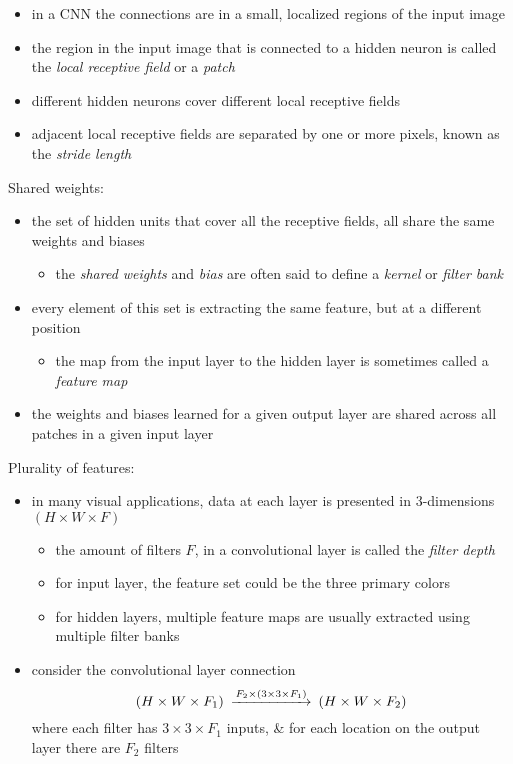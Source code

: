 \documentclass[onecolumn]{IEEEtran}
\newcommand{\beq}{\begin{equation}}
\newcommand{\eeq}{\end{equation}}
\newcommand{\bi}{\begin{itemize}}
\newcommand{\ei}{\end{itemize}}
\begin{document}
\begin{itemize}
        \item in a CNN the connections are in a small, localized regions of the input image
        \item the region in the input image that is connected to a hidden neuron is called the \emph{local receptive field} or a \emph{patch}
        \item different hidden neurons cover different local receptive fields
        \item adjacent local receptive fields are separated by one or more pixels, known as the \emph{stride length}
    \ei
    \item Shared weights:
    \bi
        \item the set of hidden units that cover all the receptive fields, all share the same weights and biases
        \bi
            \item the \emph{shared weights} and \emph{bias} are often said to define a \emph{kernel} or \emph{filter bank}
        \ei
        \item every element of this set is extracting the same feature, but at a different position
        \bi
            \item  the map from the input layer to the hidden layer is sometimes called a \emph{feature map}
        \ei
        \item the weights and biases learned for a given output layer are shared across all patches in a given input layer
    \ei
    \item Plurality of features:
    \bi
      \item in many visual applications, data at each layer is presented in $3$-dimensions $(H \times W \times F)$
      \bi
            \item the amount of filters $F$, in a convolutional layer is called the \emph{filter depth}
            \item for input layer, the feature set could be the three primary colors
            \item for hidden layers, multiple feature maps are usually extracted using multiple filter banks
      \ei
      \item consider the convolutional layer connection
      \beq\label{filter_size}\begin{CD}
            (H \times W \times F_1) @>F_2 \times (3\times 3 \times F_1)>>  (H \times W \times F_2)
      \end{CD}\eeq
      where each filter has $3\times 3 \times F_1$ inputs, \& for each location on the output layer there are $F_2$ filters

\end{itemize}
\end{document}
